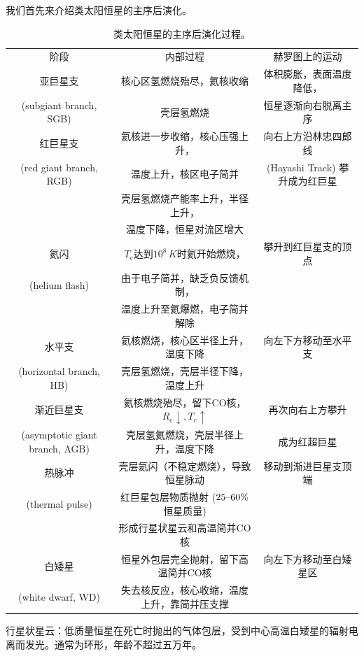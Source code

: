 \documentclass[../天体物理基础.tex]{subfiles}
\begin{document}
我们首先来介绍类太阳恒星的主序后演化。
\begin{table}[!htbp]
\centering
\caption{类太阳恒星的主序后演化过程。}
\begin{tabular}{c c c}
\hline
阶段 & 内部过程 & 赫罗图上的运动\\
\cline{1-3}
亚巨星支 & 核心区氢燃烧殆尽，氦核收缩 & 体积膨胀，表面温度降低，\\
(subgiant branch, SGB) & 壳层氢燃烧 & 恒星逐渐向右脱离主序\\
\cline{1-3}
红巨星支 & 氦核进一步收缩，核心压强上升， & 向右上方沿林忠四郎线\\
(red giant branch, RGB) & 温度上升，核区电子简并 & (Hayashi Track) 攀升成为红巨星\\
 & 壳层氢燃烧产能率上升，半径上升， & \\
 & 温度下降，恒星对流区增大 & \\
\cline{1-3}
氦闪 & $T_{\text{c}}$达到$10^{8}\,\unit{K}$时氦开始燃烧，& 攀升到红巨星支的顶点\\
(helium flash) & 由于电子简并，缺乏负反馈机制， & \\
 & 温度上升至氦爆燃，电子简并解除 & \\
\cline{1-3}
水平支 & 氦核燃烧，核心区半径上升，温度下降 & 向左下方移动至水平支\\
(horizontal branch, HB) & 壳层氢燃烧，壳层半径下降，温度上升 & \\
\cline{1-3}
渐近巨星支 & 氦核燃烧殆尽，留下$\mathrm{CO}$核，$R_{\text{c}}\downarrow,T_{\text{c}}\uparrow$ & 再次向右上方攀升\\
(asymptotic giant branch, AGB) & 壳层氢氦燃烧，壳层半径上升，温度下降 & 成为红超巨星\\
\cline{1-3}
热脉冲 & 壳层氦闪（不稳定燃烧），导致恒星脉动 & 移动到渐进巨星支顶端\\
(thermal pulse) & 红巨星包层物质抛射 ($25\text{\textendash}60\%$恒星质量) & \\
 & 形成行星状星云和高温简并$\mathrm{CO}$核 & \\
\cline{1-3}
白矮星 & 恒星外包层完全抛射，留下高温简并$\mathrm{CO}$核 & 向左下方移动至白矮星区\\
(white dwarf, WD) & 失去核反应，核心收缩，温度上升，靠简并压支撑 & \\
\hline
\end{tabular}
\label{}
\end{table}

行星状星云：低质量恒星在死亡时抛出的气体包层，受到中心高温白矮星的辐射电离而发光。通常为环形，年龄不超过五万年。
\end{document}
